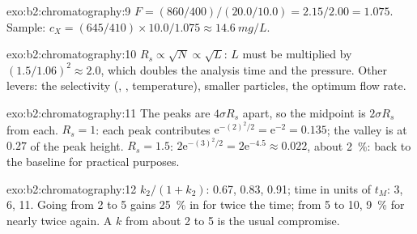 \begin{solution}{exo:b2:chromatography:9}
$F = (860/400)/(20.0/10.0) = 2.15/2.00 = 1.075$. Sample: $c_X = (645/410) \times 10.0/1.075 \approx
\qty{14.6}{mg/L}$.
\end{solution}

\begin{solution}{exo:b2:chromatography:10}
$R_s \propto \sqrt N \propto \sqrt L$: $L$ must be multiplied by $(1.5/1.06)^2 \approx 2.0$, which doubles
the analysis time and the pressure. Other levers: the selectivity (, ,
temperature), smaller particles, the optimum flow rate.
\end{solution}

\begin{solution}{exo:b2:chromatography:11}
The peaks are $4\sigma R_s$ apart, so the midpoint is $2\sigma R_s$ from each. $R_s = 1$: each peak
contributes $\mathrm e^{-(2)^2/2} = \mathrm e^{-2} = 0.135$; the valley is at $0.27$ of the peak height.
$R_s = 1.5$: $2\mathrm e^{-(3)^2/2} = 2\mathrm e^{-4.5} \approx 0.022$, about 2~\%: back to the baseline
for practical purposes.
\end{solution}

\begin{solution}{exo:b2:chromatography:12}
$k_2/(1+k_2)$: 0.67, 0.83, 0.91; time in units of $t_M$: 3, 6, 11. Going from 2 to 5 gains 25~\% in
 for twice the time; from 5 to 10, 9~\% for nearly twice again. A $k$ from about 2 to 5 is
the usual compromise.
\end{solution}

